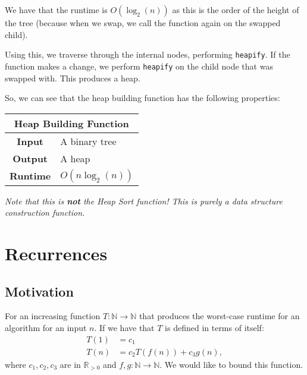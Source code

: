 \documentclass[a4paper, 12pt, twoside]{article}
\begin{document}
We have that the runtime is $O(\log_2(n))$ as this is the order
of the height of the tree (because when we swap, we call
the function again on the swapped child).

\vspace{\baselineskip}

Using this, we traverse through the internal nodes, performing
\texttt{heapify}. If the function makes a change, we perform
\texttt{heapify} on the child node that was swapped with.
This produces a heap.

\vspace{\baselineskip}

So, we can see that the heap building function has the following
properties:

\begin{center}
      \begin{tabular}{ || c | p{8.5cm} || }
                  \multicolumn{2}{c}{Heap Building Function} \\
            \hline
                  \textbf{Input} & A binary tree \\
                  \textbf{Output} & A heap \\
            \hline\hline
                  \textbf{Runtime} & $O(n\log_2(n))$ \\
            \hline
      \end{tabular}
\end{center}

\textit{Note that this is \textbf{not} the Heap Sort function! This is purely
a data structure construction function.}

\section{Recurrences}

\subsection{Motivation}

For an increasing function $T: \mathbb{N} \to \mathbb{N}$ that
produces the worst-case runtime for an algorithm for an input
$n$. If we have that $T$ is defined in terms of itself:
\begin{align*}
      T(1) &= c_1 \\
      T(n) &= c_2T(f(n)) + c_3g(n),
\end{align*}
where $c_1, c_2, c_3$ are in $\mathbb{R}_{>0}$ and 
$f, g: \mathbb{N} \to \mathbb{N}$. We would like to bound
this function.
\end{document}
